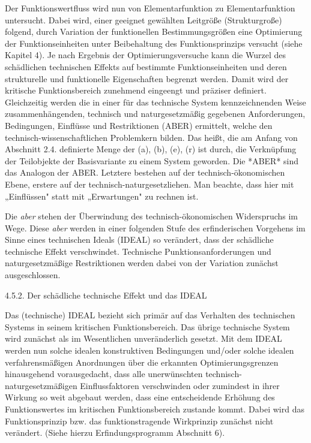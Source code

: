 \documentclass[12pt,a4paper]{article}
\begin{document}
Der Funktionswertfluss wird nun von Elementarfunktion zu Elementarfunktion untersucht. Dabei wird, einer geeignet gewählten Leit­größe (Strukturgroße) folgend, durch Variation der funktionellen Bestimmungsgrößen eine Optimierung der Funktionseinheiten unter Beibehaltung des Funktionsprinzips versucht (siehe Kapitel 4). Je nach Ergebnis der Optimierungsversuche kann die Wurzel des schädlichen technischen Effekts auf bestimmte Funktionseinheiten und deren strukturelle und funktionelle Eigenschaften begrenzt werden. Damit wird der kritische Funktionsbereich zunehmend eingeengt und präziser definiert. Gleichzeitig werden die in einer für das technische System kennzeichnenden Weise zusammenhängenden, technisch und naturgesetzmäßig gegebenen Anforderungen, Bedingungen, Einflüsse und Restriktionen (ABER) ermittelt, welche den technisch-wissenschaftlichen Problemkern bilden. Das heißt, die am Anfang von Abschnitt 2.4. definierte Menge der (a), (b), (e), (r) ist durch, die Verknüpfung der Teilobjekte der Basisvari­ante zu einem System geworden. Die *ABER* sind das Analogon der ABER. Letztere bestehen auf der technisch-ökonomischen Ebene, erstere auf der technisch-naturgesetzliehen. Man beachte, dass hier mit „Einflüssen" statt mit „Erwartungen" zu rechnen ist.

Die \emph{aber} stehen der Überwindung des technisch-ökonomischen Widerspruchs im Wege. Diese \emph{aber} werden in einer folgenden Stufe des erfinderischen Vorgehens im Sinne eines technischen Ideals (IDEAL) so verändert, dass der schädliche technische Effekt verschwindet. Technische Punktionsanforderungen und naturgesetzmäßige Restriktionen werden dabei von der Variation zunächst ausgeschlossen.


4.5.2.  Der schädliche technische Effekt und das IDEAL

Das (technische) IDEAL bezieht sich primär auf das Verhalten des technischen Systems in seinem kritischen Funktionsbereich. Das übrige technische System wird zunächst als im Wesentlichen unveränderlich gesetzt. Mit dem IDEAL werden nun solche idealen konstruktiven Bedingungen und/oder solche idealen verfahrensmäßigen Anordnungen über die erkannten Optimierungsgrenzen hinausgehend vorausgedacht, dass alle unerwünschten technisch-naturgesetzmäßigen Einflussfaktoren verschwinden oder zumindest in ihrer Wirkung so weit abgebaut werden, dass eine entscheidende Erhöhung des Funktionswertes im kritischen Funktionsbereich zustande kommt. Dabei wird das Funktionsprinzip bzw. das funktionstragende Wirk­prinzip zunächst nicht verändert. (Siehe hierzu Erfindungsprogramm Abschnitt 6).
\end{document}
